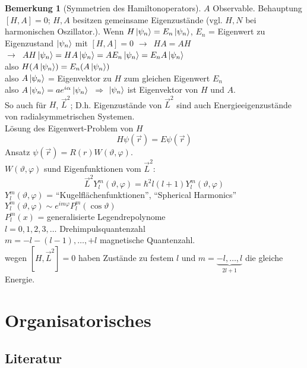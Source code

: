 \documentclass[oneside]{book}
\theoremstyle{definition}
\newtheorem*{bemerkung*}{Bemerkung}
\newcommand{\conseq}{$\rightarrow$~}
\newcommand{\vp}{\varphi}
\begin{document}
\begin{bemerkung*}[Symmetrien des Hamiltonoperators]
$A$ Observable. Behauptung $[H, A] = 0$; $H, A$ besitzen gemeinsame Eigenzustände (vgl. $H, N$ bei harmonischen Oszillator.).
Wenn $H \ket{\psi_n} = E_n \ket{\psi_n}$, $E_n$ = Eigenwert zu Eigenzustand $\ket{\psi_n}$ mit $[H, A] = 0$ \conseq $HA = AH$\\
\conseq $A H \ket{\psi_n} = H A \ket{\psi_n} = A E_n \ket{\psi_n} = E_n A \ket{\psi_n}$\\
also $H (A \ket{\psi_n}) = E_n (A \ket{\psi_n})$\\
also $A \ket{\psi_n}$ = Eigenvektor zu $H$ zum gleichen Eigenwert $E_n$\\
also $A \ket{\psi_n} = a e^{i \alpha} \ket{\psi_n}$\
$\Rightarrow$ $\ket{\psi_n}$ ist Eigenvektor von $H$ und $A$.\\
So auch für $H$, $\vec{L}^2$; D.h. Eigenzustände von $\vec{L}^2$ sind auch Energieeigenzustände von radialsymmetrischen Systemen.\\
Lösung des Eigenwert-Problem von $H$
$$H \psi(\vec{r}) = E \psi(\vec{r})$$
Ansatz $\psi(\vec{r}) = R(r) W(\vartheta, \vp)$.\\
$W(\vartheta, \vp)$ sund Eigenfunktionen vom  $\vec{L}^2$:
$$\vec{L}^2 Y_l^m(\vartheta, \vp) = \hbar^2 l (l + 1) Y_l^m(\vartheta, \vp)$$
$Y_l^m(\vartheta, \vp)$ = "`Kugelflächenfunktionen"', "`Spherical Harmonics"'\\
$Y_l^m(\vartheta, \vp) \sim e^{im \vp} P_l^m(\cos \vartheta)$\\
$P_l^m(x)$ = generalisierte Legendrepolynome\\
$l = 0, 1, 2, 3, \dots$ Drehimpulsquantenzahl\\
$m = -l -(l - 1), \dots, +l$ magnetische Quantenzahl.\\
wegen $[H, \vec{L}^2] = 0$ haben Zustände zu festem $l$ und $m = \underbrace{- l, \dots, l}_{2 l + 1}$ die gleiche Energie.
\end{bemerkung*}

\appendix


\chapter{Organisatorisches}

\section{Literatur}
\end{document}
